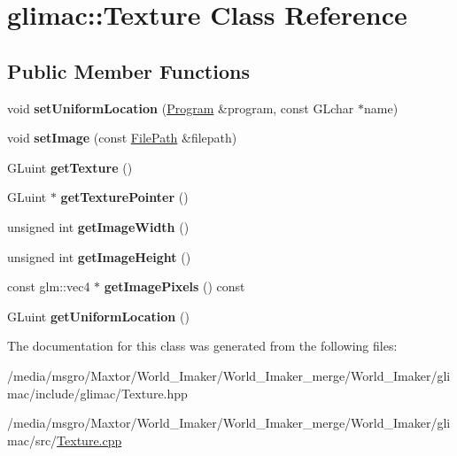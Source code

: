 \hypertarget{classglimac_1_1Texture}{}\section{glimac\+:\+:Texture Class Reference}
\label{classglimac_1_1Texture}
\subsection*{Public Member Functions}
\begin{DoxyCompactItemize}
\item 
\mbox{\label{classglimac_1_1Texture_a2a1e06217a8c98f4ddd7c271b7590c03}} 
void {\bfseries set\+Uniform\+Location} (\hyperlink{classglimac_1_1Program}{Program} \&program, const G\+Lchar $\ast$name)
\item 
\mbox{\label{classglimac_1_1Texture_a412726a887d5b80d6382e0d25584661f}} 
void {\bfseries set\+Image} (const \hyperlink{classglimac_1_1FilePath}{File\+Path} \&filepath)
\item 
\mbox{\label{classglimac_1_1Texture_aab4d5370b02499884260a3ce9e7349be}} 
G\+Luint {\bfseries get\+Texture} ()
\item 
\mbox{\label{classglimac_1_1Texture_ac222b4e2c040a8b64484bb60eb73574f}} 
G\+Luint $\ast$ {\bfseries get\+Texture\+Pointer} ()
\item 
\mbox{\label{classglimac_1_1Texture_af27c9e6a54fe8a60cedaad97d8acbcae}} 
unsigned int {\bfseries get\+Image\+Width} ()
\item 
\mbox{\label{classglimac_1_1Texture_a66760a2dc586c0780ee3b9961048424b}} 
unsigned int {\bfseries get\+Image\+Height} ()
\item 
\mbox{\label{classglimac_1_1Texture_a7060818013d2bfbe42df5d0b01f2825d}} 
const glm\+::vec4 $\ast$ {\bfseries get\+Image\+Pixels} () const
\item 
\mbox{\label{classglimac_1_1Texture_a80d018b2208095d54c3439e6328761ff}} 
G\+Luint {\bfseries get\+Uniform\+Location} ()
\end{DoxyCompactItemize}


The documentation for this class was generated from the following files\+:\begin{DoxyCompactItemize}
\item 
/media/msgro/\+Maxtor/\+World\+\_\+\+Imaker/\+World\+\_\+\+Imaker\+\_\+merge/\+World\+\_\+\+Imaker/glimac/include/glimac/Texture.\+hpp\item 
/media/msgro/\+Maxtor/\+World\+\_\+\+Imaker/\+World\+\_\+\+Imaker\+\_\+merge/\+World\+\_\+\+Imaker/glimac/src/\hyperlink{Texture_8cpp}{Texture.\+cpp}\end{DoxyCompactItemize}
